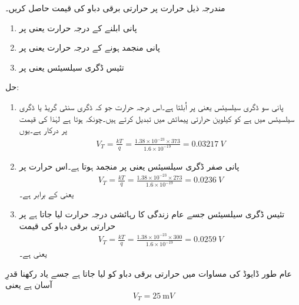 مندرجہ ذیل حرارت پر حرارتی برقی دباو   کی قیمت حاصل کریں۔
\begin{enumerate}
\item
پانی ابلنے کے درجہ حرارت یعنی   پر

\item

پانی منجمد ہونے کے درجہ حرارت یعنی  پر
\item

تئیس ڈگری سیلسیئس یعنی   پر
\end{enumerate}




حل:
\begin{enumerate}
\item
پانی سو ڈگری سیلسیئس یعنی  پر اُبلتا ہے۔اس درجہ حرارت جو کہ ڈگری سنٹی گریڈ یا ڈگری سیلسیئس   میں ہے کو کیلوین  حرارتی پیمائش میں تبدیل کرتے ہیں۔چونکہ  ہوتا ہے لہٰذا  کی قیمت  پر درکار ہے۔یوں 
\begin{align*}
V_T =\frac{k T}{q} =\frac{1.38 \times 10^{-23} \times 373}{1.6 \times 10^{-19}}=\SI{0.03217}{V}
\end{align*}

\item
پانی صفر ڈگری سیلسیئس یعنی  پر منجمد ہوتا ہے۔اس حرارت پر
\begin{align*}
V_T=\frac{k T}{q}=\frac{1.38 \times 10^{-23} \times 273}{1.6 \times 10^{-19}}=\SI{0.0236}{V}
\end{align*}
یعنی  کے برابر ہے۔
\item
تئیس ڈگری سیلسیئس جسے عام زندگی کا رہائشی درجہ حرارت لیا جاتا ہے پر حرارتی برقی دباو کی قیمت 
\begin{align*}
V_T=\frac{k T}{q}=\frac{1.38 \times 10^{-23} \times 300}{1.6 \times 10^{-19}}=\SI{0.0259}{V}
\end{align*}
یعنی   ہے۔
\end{enumerate}
عام طور ڈایوڈ کی مساوات میں حرارتی برقی دباو کو  لیا جاتا ہے جسے یاد رکھنا قدرِ آسان ہے یعنی
\begin{align}
V_T=\SI{25}{\milli V}
\end{align}

